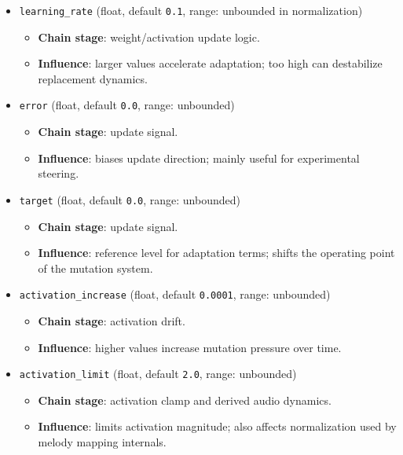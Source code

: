 \documentclass[11pt,a4paper]{article}
\begin{document}
\begin{itemize}
  \item \texttt{learning\_rate} (float, default \texttt{0.1}, range: unbounded in normalization)
  \begin{itemize}
    \item \textbf{Chain stage}: weight/activation update logic.
    \item \textbf{Influence}: larger values accelerate adaptation; too high can destabilize replacement dynamics.
  \end{itemize}

  \item \texttt{error} (float, default \texttt{0.0}, range: unbounded)
  \begin{itemize}
    \item \textbf{Chain stage}: update signal.
    \item \textbf{Influence}: biases update direction; mainly useful for experimental steering.
  \end{itemize}

  \item \texttt{target} (float, default \texttt{0.0}, range: unbounded)
  \begin{itemize}
    \item \textbf{Chain stage}: update signal.
    \item \textbf{Influence}: reference level for adaptation terms; shifts the operating point of the mutation system.
  \end{itemize}

  \item \texttt{activation\_increase} (float, default \texttt{0.0001}, range: unbounded)
  \begin{itemize}
    \item \textbf{Chain stage}: activation drift.
    \item \textbf{Influence}: higher values increase mutation pressure over time.
  \end{itemize}

  \item \texttt{activation\_limit} (float, default \texttt{2.0}, range: unbounded)
  \begin{itemize}
    \item \textbf{Chain stage}: activation clamp and derived audio dynamics.
    \item \textbf{Influence}: limits activation magnitude; also affects normalization used by melody mapping internals.
  \end{itemize}


\end{itemize}
\end{document}
